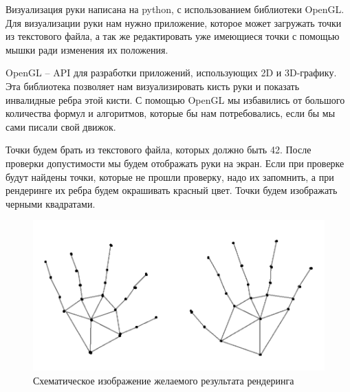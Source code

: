 \hspace{0.6cm} Визуализация руки написана на python, с использованием библиотеки OpenGL. Для визуализации руки нам нужно приложение, которое может загружать точки из текстового файла, а так же редактировать уже имеющиеся точки с помощью мышки ради изменения их положения.

\hspace{0.6cm} OpenGL – API для разработки приложений, использующих 2D и 3D-графику. Эта библиотека позволяет нам визуализировать кисть руки и показать инвалидные ребра этой кисти. С помощью OpenGL мы избавились от большого количества формул и алгоритмов, которые бы нам потребовались, если бы мы сами писали свой движок.

\hspace{0.6cm} Точки будем брать из текстового файла, которых должно быть 42. После проверки допустимости мы будем отображать руки на экран. Если при проверке будут найдены точки, которые не прошли проверку, надо их запомнить, а при рендеринге их ребра будем окрашивать красный цвет. Точки будем изображать черными квадратами.

\begin{figure}[ht!]
	\centering
	\includegraphics[scale=0.65]{schematic.png}
	\caption{Схематическое изображение желаемого результата рендеринга}
	\label{fig:example4}
\end{figure}
	

